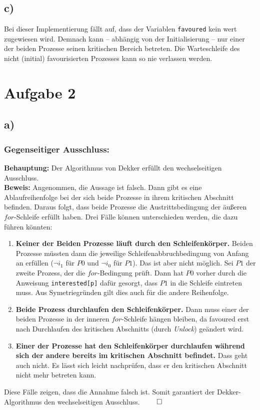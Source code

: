 \documentclass[11pt,a4paper,DIV=10,]{scrartcl}
\begin{document}
\subsection*{c)}
Bei dieser Implementierung fällt auf, dass der Variablen \texttt{favoured} kein wert zugewiesen wird. Demnach kann -- abhängig von der Initialisierung -- nur einer der beiden Prozesse seinen kritischen Bereich betreten. Die Warteschleife des nicht (initial) favourisierten Prozesses kann so nie verlassen werden.
\section*{Aufgabe 2}
\subsection*{a)}
\subsubsection*{Gegenseitiger Ausschluss:}
\textbf{Behauptung:} Der Algorithmus von Dekker erfüllt den wechselseitigen Ausschluss.\\
\textbf{Beweis:} Angenommen, die Aussage ist falsch. Dann gibt es eine Ablaufreihenfolge bei der sich beide Prozesse in ihrem kritischen Abschnitt befinden. Daraus folgt, dass beide Prozesse die Austrittsbedingung  der äußeren $for$-Schleife erfüllt haben. Drei Fälle können unterschieden werden, die dazu führen könnten:
\begin{enumerate}
\item \textbf{Keiner der Beiden Prozesse läuft durch den Schleifenkörper.} Beiden Prozesse müssten dann die jeweilige Schleifenabbruchbedingung von Anfang an erfüllen ($\neg i_1$ für $P0$ und $\neg i_0$ für $P1$). Das ist aber nicht möglich. Sei $P1$ der zweite Prozess, der die $for$-Bedingung prüft. Dann hat $P0$ vorher durch die Anweisung  \texttt{interested[p]} dafür gesorgt, dass $P1$ in die Schleife eintreten muss. Aus Symetriegründen gilt dies auch für die andere Reihenfolge.
\item \textbf{Beide Prozess durchlaufen den Schleifenkörper.} Dann muss einer der beiden Prozesse in der inneren $for$-Schleife hängen bleiben, da favoured erst nach Durchlaufen des kritischen Abschnitts (durch \textit{Unlock}) geändert wird.
\item \textbf{Einer der Prozesse hat den Schleifenkörper durchlaufen während sich der andere bereits im kritischen Abschnitt befindet.} Dass geht auch nicht. Es lässt sich leicht nachprüfen, dass er den kritischen Abschnitt nicht mehr betreten kann.
\end{enumerate}
Diese Fälle zeigen, dass die Annahme falsch ist. Somit garantiert der Dekker-Algorithmus den wechselseitigen Ausschluss. $\qed$
\end{document}
